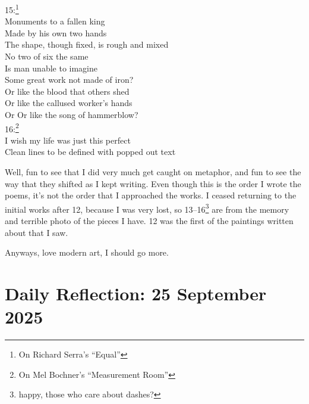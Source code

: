 \documentclass[12pt]{article}
\newcommand{\say}[1]{``#1''}
\renewcommand{\,}{\textsuperscript{,}}
\begin{document}
15:\footnote{On Richard Serra's \say{Equal}}\\
Monuments to a fallen king\\
Made by his own two hands\\
The shape, though fixed, is rough and mixed\\
No two of six the same\\
Is man unable to imagine\\
Some great work not made of iron?\\
Or like the blood that others shed\\
Or like the callused worker's hands\\
Or Or like the song of hammerblow?\\

16:\footnote{On Mel Bochner's \say{Measurement Room}}\\
I wish my life was just this perfect\\
Clean lines to be defined with popped out text

Well, fun to see that I did very much get caught on metaphor, and fun to see the way that they shifted as I kept writing.
Even though this is the order I wrote the poems, it's not the order that I approached the works.
I ceased returning to the initial works after 12, because I was very lost, so 13--16\footnote{happy, those who care about dashes?} are from the memory and terrible photo of the pieces I have.
12 was the first of the paintings written about that I saw.

Anyways, love modern art, I should go more.
\section{Daily Reflection: 25 September 2025}
\end{document}
